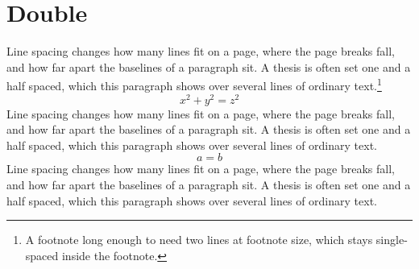 \documentclass{article}
\begin{document}
\section{Double}
Line spacing changes how many lines fit on a page, where the page breaks fall, and how far apart the baselines of a paragraph sit. A thesis is often set one and a half spaced, which this paragraph shows over several lines of ordinary text.\footnote{A footnote long enough to need two lines at footnote size, which stays single-spaced inside the footnote.}
\[ x^2 + y^2 = z^2 \]
Line spacing changes how many lines fit on a page, where the page breaks fall, and how far apart the baselines of a paragraph sit. A thesis is often set one and a half spaced, which this paragraph shows over several lines of ordinary text.
\begin{equation} a = b \end{equation}
Line spacing changes how many lines fit on a page, where the page breaks fall, and how far apart the baselines of a paragraph sit. A thesis is often set one and a half spaced, which this paragraph shows over several lines of ordinary text.
\end{document}
